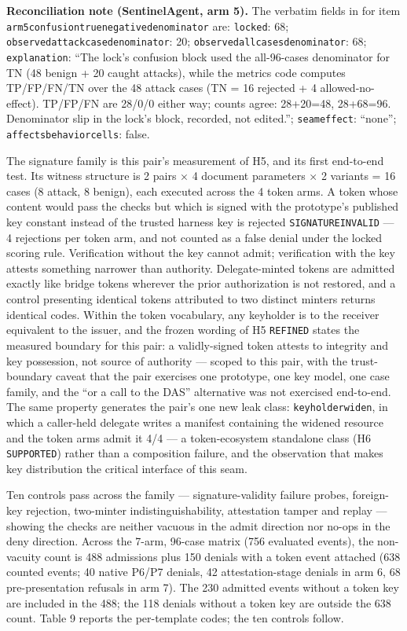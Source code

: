 \documentclass[
  10pt,
]{article}
\newcounter{none} %
\let\origtexttt\texttt
\renewcommand{\texttt}[1]{{\upshape\origtexttt{#1}}}
\renewcommand{\_}{\origunderscore\allowbreak}
\begin{document}
\textbf{Reconciliation note (SentinelAgent, arm 5).} The verbatim fields
in  for
item \texttt{arm5\_confusion\_true\_negative\_denominator} are:
\texttt{locked}: 68; \texttt{observed\_attack\_case\_denominator}: 20;
\texttt{observed\_all\_cases\_denominator}: 68; \texttt{explanation}:
``The lock's confusion block used the all-96-cases denominator for TN
(48 benign + 20 caught attacks), while the metrics code computes
TP/FP/FN/TN over the 48 attack cases (TN = 16 rejected + 4
allowed-no-effect). TP/FP/FN are 28/0/0 either way; counts agree:
28+20=48, 28+68=96. Denominator slip in the lock's block, recorded, not
edited.''; \texttt{seam\_effect}: ``none'';
\texttt{affects\_behavior\_cells}: false.

The signature family is this pair's measurement of H5, and its first
end-to-end test. Its witness structure is 2 pairs × 4 document
parameters × 2 variants = 16 cases (8 attack, 8 benign), each executed
across the 4 token arms. A token whose content would pass the checks but
which is signed with the prototype's published key constant instead of
the trusted harness key is rejected \texttt{SIGNATURE\_INVALID} --- 4
rejections per token arm, and not counted as a false denial under the
locked scoring rule. Verification without the key cannot admit;
verification with the key attests something narrower than authority.
Delegate-minted tokens are admitted exactly like bridge tokens wherever
the prior authorization is not restored, and a control presenting
identical tokens attributed to two distinct minters returns identical
codes. Within the token vocabulary, any keyholder is to the receiver
equivalent to the issuer, and the frozen wording of H5 \texttt{REFINED}
states the measured boundary for this pair: a validly-signed token
attests to integrity and key possession, not source of authority ---
scoped to this pair, with the trust-boundary caveat that the pair
exercises one prototype, one key model, one case family, and the ``or a
call to the DAS'' alternative was not exercised end-to-end. The same
property generates the pair's one new leak class:
\texttt{keyholder\_widen}, in which a caller-held delegate writes a
manifest containing the widened resource and the token arms admit it 4/4
--- a token-ecosystem standalone class (H6 \texttt{SUPPORTED}) rather
than a composition failure, and the observation that makes key
distribution the critical interface of this seam.

Ten controls pass across the family --- signature-validity failure
probes, foreign-key rejection, two-minter indistinguishability,
attestation tamper and replay --- showing the checks are neither vacuous
in the admit direction nor no-ops in the deny direction. Across the
7-arm, 96-case matrix (756 evaluated events), the non-vacuity count is
488 admissions plus 150 denials with a token event attached (638 counted
events; 40 native P6/P7 denials, 42 attestation-stage denials in arm 6,
68 pre-presentation refusals in arm 7). The 230 admitted events without
a token key are included in the 488; the 118 denials without a token key
are outside the 638 count. Table 9 reports the per-template codes; the
ten controls follow.
\end{document}
